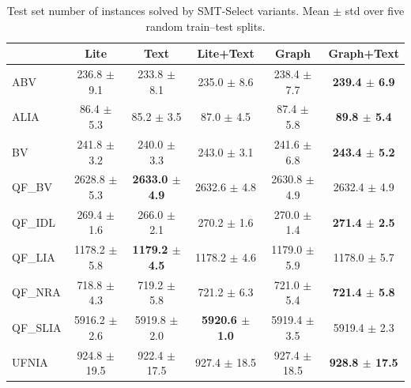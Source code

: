 \begin{table}[h]
\centering
\begin{tabular*}{\columnwidth}{@{\extracolsep{\fill}}@{}lccccc@{}}
\toprule
 & Lite & Text & Lite+Text & Graph & Graph+Text \\
\midrule
ABV & 236.8 $\pm$ 9.1 & 233.8 $\pm$ 8.1 & 235.0 $\pm$ 8.6 & 238.4 $\pm$ 7.7 & \textbf{239.4 $\pm$ 6.9} \\
ALIA & 86.4 $\pm$ 5.3 & 85.2 $\pm$ 3.5 & 87.0 $\pm$ 4.5 & 87.4 $\pm$ 5.8 & \textbf{89.8 $\pm$ 5.4} \\
BV & 241.8 $\pm$ 3.2 & 240.0 $\pm$ 3.3 & 243.0 $\pm$ 3.1 & 241.6 $\pm$ 6.8 & \textbf{243.4 $\pm$ 5.2} \\
QF\_BV & 2628.8 $\pm$ 5.3 & \textbf{2633.0 $\pm$ 4.9} & 2632.6 $\pm$ 4.8 & 2630.8 $\pm$ 4.9 & 2632.4 $\pm$ 4.9 \\
QF\_IDL & 269.4 $\pm$ 1.6 & 266.0 $\pm$ 2.1 & 270.2 $\pm$ 1.6 & 270.0 $\pm$ 1.4 & \textbf{271.4 $\pm$ 2.5} \\
QF\_LIA & 1178.2 $\pm$ 5.8 & \textbf{1179.2 $\pm$ 4.5} & 1178.2 $\pm$ 4.6 & 1179.0 $\pm$ 5.9 & 1178.0 $\pm$ 5.7 \\
QF\_NRA & 718.8 $\pm$ 4.3 & 719.2 $\pm$ 5.8 & 721.2 $\pm$ 6.3 & 721.0 $\pm$ 5.4 & \textbf{721.4 $\pm$ 5.8} \\
QF\_SLIA & 5916.2 $\pm$ 2.6 & 5919.8 $\pm$ 2.0 & \textbf{5920.6 $\pm$ 1.0} & 5919.4 $\pm$ 3.5 & 5919.4 $\pm$ 2.3 \\
UFNIA & 924.8 $\pm$ 19.5 & 922.4 $\pm$ 17.5 & 927.4 $\pm$ 18.5 & 927.4 $\pm$ 18.5 & \textbf{928.8 $\pm$ 17.5} \\
\bottomrule
\end{tabular*}
\caption{Test set number of instances solved by SMT-Select variants. Mean $\pm$ std over five random train--test splits.}
\label{tab:solved_variability}
\end{table}
